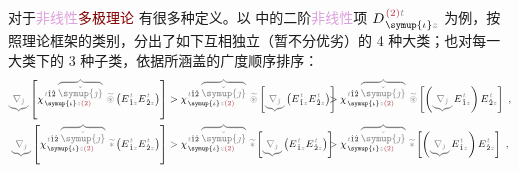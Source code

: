 对于\textcolor{Plum}{非线性}\textcolor{Maroon}{多极理论}  有很多种定义。以  中的二阶\textcolor{Plum}{非线性}项 $D^{\;\! \textcolor{Maroon}{(2)} \mathcolor{gray}{t}}_{\;\! \symup{\iota}\mathcolor{gray}{z}}$ 为例，按照\textcolor{NavyBlue}{理论框架}的类别，分出了如下互相独立（暂不分优劣）的 4 种大类；也对每一大类下的 3 种子类，依据所涵盖的广度顺序排序：
\begin{subequations}
	\small
\begin{align}
	\mathcolor{gray}{\underbrace{\nabla_{\check{\jmath}}}} \left[ \chi^{\;\! \mathcolor{gray}{t} \hat{1} \hat{2} \;\! \mathcolor{gray}{\overbrace{\check{\symup{\jmath}}}}}_{\;\! \symup{\iota} \mathcolor{gray}{z} \textcolor{Maroon}{(2)}} ~\mathcolor{gray}{\widetilde \circledast} \left( E^{\;\!\mathcolor{gray}{t}}_{\;\! \hat{1} \mathcolor{gray}{z}} E^{\;\!\mathcolor{gray}{t}}_{\;\! \hat{2} \mathcolor{gray}{z}} \right) \right] &> \chi^{\;\! \mathcolor{gray}{t} \hat{1} \hat{2} \;\! \mathcolor{gray}{\overbrace{\check{\symup{\jmath}}}}}_{\;\! \symup{\iota} \mathcolor{gray}{z} \textcolor{Maroon}{(2)}} ~\mathcolor{gray}{\widetilde \circledast} \left[ \mathcolor{gray}{\underbrace{\nabla_{\check{\jmath}}}} \left( E^{\;\!\mathcolor{gray}{t}}_{\;\! \hat{1} \mathcolor{gray}{z}} E^{\;\!\mathcolor{gray}{t}}_{\;\! \hat{2} \mathcolor{gray}{z}} \right) \right] \hspace{-2em}&&> \chi^{\;\! \mathcolor{gray}{t} \hat{1} \hat{2} \;\! \mathcolor{gray}{\overbrace{\check{\symup{\jmath}}}}}_{\;\! \symup{\iota} \mathcolor{gray}{z} \textcolor{Maroon}{(2)}} ~\mathcolor{gray}{\widetilde \circledast} \left[ \left( \mathcolor{gray}{\underbrace{\nabla_{\check{\jmath}}}} E^{\;\!\mathcolor{gray}{t}}_{\;\! \hat{1} \mathcolor{gray}{z}} \right) E^{\;\!\mathcolor{gray}{t}}_{\;\! \hat{2} \mathcolor{gray}{z}} \right]~, \label{eq:Volterra} \\
	\mathcolor{gray}{\underbrace{\nabla_{\check{\jmath}}}} \left[ \chi^{\;\! \mathcolor{gray}{t} \hat{1} \hat{2} \;\! \mathcolor{gray}{\overbrace{\check{\symup{\jmath}}}}}_{\;\! \symup{\iota} \mathcolor{gray}{z} \textcolor{Maroon}{(2)}} ~\mathcolor{gray}{\widetilde *} \left( E^{\;\!\mathcolor{gray}{t}}_{\;\! \hat{1} \mathcolor{gray}{z}} E^{\;\!\mathcolor{gray}{t}}_{\;\! \hat{2} \mathcolor{gray}{z}} \right) \right] &> \chi^{\;\! \mathcolor{gray}{t} \hat{1} \hat{2} \;\! \mathcolor{gray}{\overbrace{\check{\symup{\jmath}}}}}_{\;\! \symup{\iota} \mathcolor{gray}{z} \textcolor{Maroon}{(2)}} ~\mathcolor{gray}{\widetilde *} \left[ \mathcolor{gray}{\underbrace{\nabla_{\check{\jmath}}}} \left( E^{\;\!\mathcolor{gray}{t}}_{\;\! \hat{1} \mathcolor{gray}{z}} E^{\;\!\mathcolor{gray}{t}}_{\;\! \hat{2} \mathcolor{gray}{z}} \right) \right] \hspace{-2em}&&> \chi^{\;\! \mathcolor{gray}{t} \hat{1} \hat{2} \;\! \mathcolor{gray}{\overbrace{\check{\symup{\jmath}}}}}_{\;\! \symup{\iota} \mathcolor{gray}{z} \textcolor{Maroon}{(2)}} ~\mathcolor{gray}{\widetilde *} \left[ \left( \mathcolor{gray}{\underbrace{\nabla_{\check{\jmath}}}} E^{\;\!\mathcolor{gray}{t}}_{\;\! \hat{1} \mathcolor{gray}{z}} \right) E^{\;\!\mathcolor{gray}{t}}_{\;\! \hat{2} \mathcolor{gray}{z}} \right]~, \label{eq:Volterra-time} \\

\end{align}
\end{subequations}
